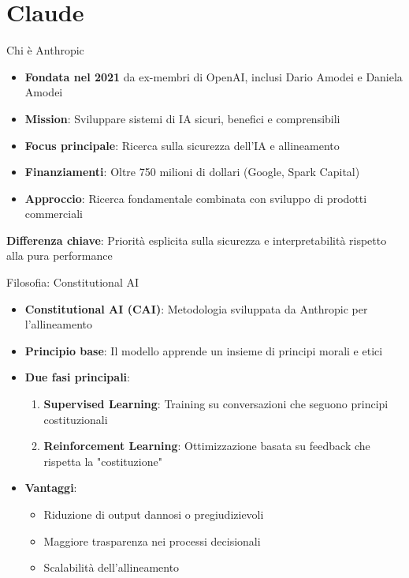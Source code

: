 \documentclass[aspectratio=169]{beamer}
\begin{document}
\section{Claude}
%
%
\begin{frame}{Chi è Anthropic}
\begin{itemize}
    \item \textbf{Fondata nel 2021} da ex-membri di OpenAI, inclusi Dario Amodei e Daniela Amodei
    \item \textbf{Mission}: Sviluppare sistemi di IA sicuri, benefici e comprensibili
    \item \textbf{Focus principale}: Ricerca sulla sicurezza dell'IA e allineamento
    \item \textbf{Finanziamenti}: Oltre 750 milioni di dollari (Google, Spark Capital)
    \item \textbf{Approccio}: Ricerca fondamentale combinata con sviluppo di prodotti commerciali
\end{itemize}

\vspace{0.5cm}
\textbf{Differenza chiave}: Priorità esplicita sulla sicurezza e interpretabilità rispetto alla pura performance
\end{frame}
%
%
\begin{frame}{Filosofia: Constitutional AI}
\begin{itemize}
    \item \textbf{Constitutional AI (CAI)}: Metodologia sviluppata da Anthropic per l'allineamento
    \item \textbf{Principio base}: Il modello apprende un insieme di principi morali e etici
    \item \textbf{Due fasi principali}:
    \begin{enumerate}
        \item \textbf{Supervised Learning}: Training su conversazioni che seguono principi costituzionali
        \item \textbf{Reinforcement Learning}: Ottimizzazione basata su feedback che rispetta la "costituzione"
    \end{enumerate}
    \item \textbf{Vantaggi}:
    \begin{itemize}
        \item Riduzione di output dannosi o pregiudizievoli
        \item Maggiore trasparenza nei processi decisionali
        \item Scalabilità dell'allineamento
    \end{itemize}
\end{itemize}
\end{frame}
\end{document}
